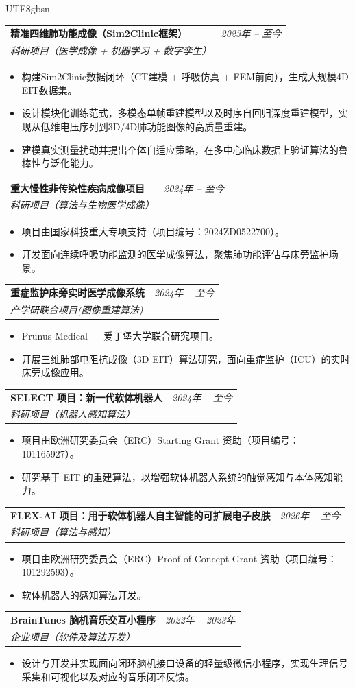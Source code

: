 \documentclass[a4paper,11pt]{article}
\makeatletter
\newcommand{\resumeProject}[4]{
\vspace{0.5mm}\item
    \begin{tabular*}{0.98\textwidth}[t]{l@{\extracolsep{\fill}}r}
        \textbf{#1} & \textit{\footnotesize{#3}} \\
        \footnotesize{\textit{#2}} & \footnotesize{#4}
    \end{tabular*}
    \vspace{-2.4mm}
}
\newcommand{\resumeItemListStart}{\begin{itemize}[leftmargin=*,labelsep=1mm,itemsep=0.5mm]}
\newcommand{\resumeItemListEnd}{\end{itemize}\vspace{-2mm}}
\makeatother
\begin{document}
\begin{CJK}{UTF8}{gbsn}
\resumeProject
  {精准四维肺功能成像（Sim2Clinic框架）}
  {科研项目（医学成像 + 机器学习 + 数字孪生）}
  {2023年 -- 至今}
  {{}}
\resumeItemListStart
\item 构建Sim2Clinic数据闭环（CT建模 + 呼吸仿真 + FEM前向），生成大规模4D EIT数据集。
\item 设计模块化训练范式，多模态单帧重建模型以及时序自回归深度重建模型，实现从低维电压序列到3D/4D肺功能图像的高质量重建。
\item 建模真实测量扰动并提出个体自适应策略，在多中心临床数据上验证算法的鲁棒性与泛化能力。
\resumeItemListEnd

\resumeProject
  {重大慢性非传染性疾病成像项目}
  {科研项目（算法与生物医学成像）}
  {2024年 -- 至今}
  {{}}
\resumeItemListStart
  \item 项目由国家科技重大专项支持（项目编号：2024ZD0522700）。
  \item 开发面向连续呼吸功能监测的医学成像算法，聚焦肺功能评估与床旁监护场景。
\resumeItemListEnd

\resumeProject
  {重症监护床旁实时医学成像系统}
  {产学研联合项目(图像重建算法)}
  {2024年 -- 至今}
  {{}}
\resumeItemListStart
  \item Prunus Medical — 爱丁堡大学联合研究项目。
  \item 开展三维肺部电阻抗成像（3D EIT）算法研究，面向重症监护（ICU）的实时床旁成像应用。
\resumeItemListEnd

\resumeProject
  {SELECT 项目：新一代软体机器人}
  {科研项目（机器人感知算法）}
  {2024年 -- 至今}
  {{}}
\resumeItemListStart
  \item 项目由欧洲研究委员会（ERC）Starting Grant 资助（项目编号：101165927）。
  \item 研究基于 EIT 的重建算法，以增强软体机器人系统的触觉感知与本体感知能力。
\resumeItemListEnd

\resumeProject
  {FLEX-AI 项目：用于软体机器人自主智能的可扩展电子皮肤}
  {科研项目（算法与感知）}
  {2026年 -- 至今}
  {{}}
\resumeItemListStart
  \item 项目由欧洲研究委员会（ERC）Proof of Concept Grant 资助（项目编号：101292593）。
  \item 软体机器人的感知算法开发。
\resumeItemListEnd

\resumeProject
  {BrainTunes 脑机音乐交互小程序}
  {企业项目（软件及算法开发）}
  {2022年 -- 2023年}
  {{}}
\resumeItemListStart
  \item 设计与开发并实现面向闭环脑机接口设备的轻量级微信小程序，实现生理信号采集和可视化以及对应的音乐闭环反馈。
\resumeItemListEnd


\end{CJK}
\end{document}
